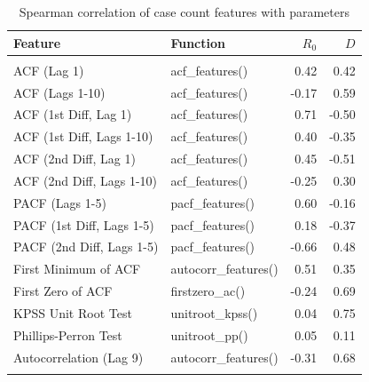 \begin{table}

\caption{\label{tab:tab:tsfeatures}Spearman correlation of case count features with parameters}
\centering
\begin{tabular}[t]{llrr}
\toprule
Feature & Function & $R_0$ & $D$\\
\midrule
\addlinespace[0.3em]
\multicolumn{4}{l}{\textbf{Autocorrelation \& Stationarity}}\\
\hspace{1em}ACF (Lag 1) & acf\_features() & 0.42 & 0.42\\
\hspace{1em}ACF (Lags 1-10) & acf\_features() & -0.17 & 0.59\\
\hspace{1em}ACF (1st Diff, Lag 1) & acf\_features() & 0.71 & -0.50\\
\hspace{1em}ACF (1st Diff, Lags 1-10) & acf\_features() & 0.40 & -0.35\\
\hspace{1em}ACF (2nd Diff, Lag 1) & acf\_features() & 0.45 & -0.51\\
\hspace{1em}ACF (2nd Diff, Lags 1-10) & acf\_features() & -0.25 & 0.30\\
\hspace{1em}PACF (Lags 1-5) & pacf\_features() & 0.60 & -0.16\\
\hspace{1em}PACF (1st Diff, Lags 1-5) & pacf\_features() & 0.18 & -0.37\\
\hspace{1em}PACF (2nd Diff, Lags 1-5) & pacf\_features() & -0.66 & 0.48\\
\hspace{1em}First Minimum of ACF & autocorr\_features() & 0.51 & 0.35\\
\hspace{1em}First Zero of ACF & firstzero\_ac() & -0.24 & 0.69\\
\hspace{1em}KPSS Unit Root Test & unitroot\_kpss() & 0.04 & 0.75\\
\hspace{1em}Phillips-Perron Test & unitroot\_pp() & 0.05 & 0.11\\
\hspace{1em}Autocorrelation (Lag 9) & autocorr\_features() & -0.31 & 0.68\\
\addlinespace[0.3em]
\multicolumn{4}{l}{\textbf{Trend \& Decomposition}}\\

\end{tabular}
\end{table}
